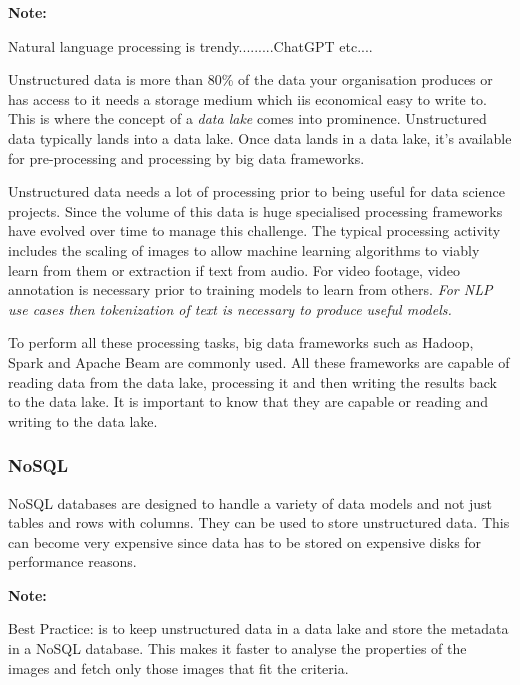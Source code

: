 \documentclass[a4paper, 11pt]{book}
\newenvironment{note}{
    \begin{siderule}
        \textbf{Note: }
        }{
    \end{siderule}}
\begin{document}
    \begin{note}
        Natural language processing is trendy.........ChatGPT etc....
    \end{note}

    Unstructured data is more than 80\% of the data your organisation produces or has access to it needs a storage medium which iis economical easy to write to.
    This is where the concept of a \textit{data lake} comes into prominence.
    Unstructured data typically lands into a data lake.
    Once data lands in a data lake, it's available for pre-processing and processing by big data frameworks.

    Unstructured data needs a lot of processing prior to being useful for data science projects.
    Since the volume of this data is huge specialised processing frameworks have evolved over time to manage this challenge.
    The typical processing activity includes the scaling of images to allow machine learning algorithms to viably learn from them or extraction if text from audio.
    For video footage, video annotation is necessary prior to training models to learn from others.
    \textit{For NLP use cases then tokenization of text is necessary to produce useful models.}

    To perform all these processing tasks, big data frameworks such as Hadoop, Spark and Apache Beam are commonly used.
    All these frameworks are capable of reading data from the data lake, processing it and then writing the results back to the data lake.
    It is important to know that they are capable or reading and writing to the data lake.

    \subsubsection{NoSQL}
    NoSQL databases are designed to handle a variety of data models and not just tables and rows with columns.
    They can be used to store unstructured data.
    This can become very expensive since data has to be stored on expensive disks for performance reasons.

    \begin{note}
        Best Practice: is to keep unstructured data in a data lake and store the metadata in a NoSQL database.
        This makes it faster to analyse the properties of the images and fetch only those images that fit the criteria.
    \end{note}
\end{document}
